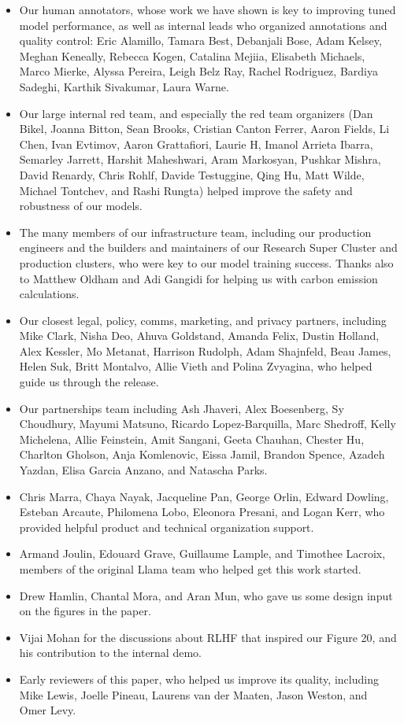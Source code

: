 \documentclass{article}
\begin{document}
\begin{itemize}
    \item Our human annotators, whose work we have shown is key to improving tuned model performance, as well as internal leads who organized annotations and quality control: Eric Alamillo, Tamara Best, Debanjali Bose, Adam Kelsey, Meghan Keneally, Rebecca Kogen, Catalina Mejiia, Elisabeth Michaels, Marco Mierke, Alyssa Pereira, Leigh Belz Ray, Rachel Rodriguez, Bardiya Sadeghi, Karthik Sivakumar, Laura Warne.
    \item Our large internal red team, and especially the red team organizers (Dan Bikel, Joanna Bitton, Sean Brooks, Cristian Canton Ferrer, Aaron Fields, Li Chen, Ivan Evtimov, Aaron Grattafiori, Laurie H, Imanol Arrieta Ibarra, Semarley Jarrett, Harshit Maheshwari, Aram Markosyan, Pushkar Mishra, David Renardy, Chris Rohlf, Davide Testuggine, Qing Hu, Matt Wilde, Michael Tontchev, and Rashi Rungta) helped improve the safety and robustness of our models.
    \item The many members of our infrastructure team, including our production engineers and the builders and maintainers of our Research Super Cluster and production clusters, who were key to our model training success. Thanks also to Matthew Oldham and Adi Gangidi for helping us with carbon emission calculations.
    \item Our closest legal, policy, comms, marketing, and privacy partners, including Mike Clark, Nisha Deo, Ahuva Goldstand, Amanda Felix, Dustin Holland, Alex Kessler, Mo Metanat, Harrison Rudolph, Adam Shajnfeld, Beau James, Helen Suk, Britt Montalvo, Allie Vieth and Polina Zvyagina, who helped guide us through the release.
    \item Our partnerships team including Ash Jhaveri, Alex Boesenberg, Sy Choudhury, Mayumi Matsuno, Ricardo Lopez-Barquilla, Marc Shedroff, Kelly Michelena, Allie Feinstein, Amit Sangani, Geeta Chauhan, Chester Hu, Charlton Gholson, Anja Komlenovic, Eissa Jamil, Brandon Spence, Azadeh Yazdan, Elisa Garcia Anzano, and Natascha Parks.  
    \item Chris Marra, Chaya Nayak, Jacqueline Pan, George Orlin, Edward Dowling, Esteban Arcaute, Philomena Lobo, Eleonora Presani, and Logan Kerr, who provided helpful product and technical organization support.
    \item Armand Joulin, Edouard Grave, Guillaume Lample, and Timothee Lacroix, members of the original Llama team who helped get this work started.
    \item Drew Hamlin, Chantal Mora, and Aran Mun, who gave us some design input on the figures in the paper.
    \item Vijai Mohan for the discussions about RLHF that inspired our Figure 20, and his contribution to the internal demo.
    \item Early reviewers of this paper, who helped us improve its quality, including Mike Lewis, Joelle Pineau, Laurens van der Maaten, Jason Weston, and Omer Levy.
\end{itemize}
\end{document}
